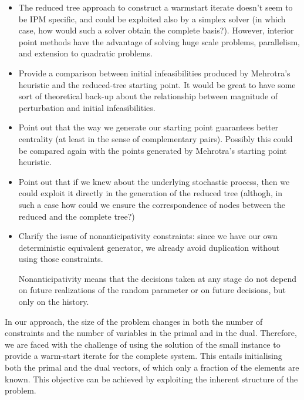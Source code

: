 \begin{itemize}
\item The reduced tree approach to construct a warmstart iterate 
doesn't seem to be IPM specific, and could be exploited also by a 
simplex solver (in which case, how would such a solver obtain the 
complete basis?). However, interior point methods have the advantage
of solving huge scale problems, parallelism, and extension to 
quadratic problems.

\item Provide a comparison between initial infeasibilities 
produced by Mehrotra's heuristic and the reduced-tree starting 
point. It would be great to have some sort of theoretical back-up 
about the relationship between magnitude of perturbation and 
initial infeasibilities.

\item Point out that the way we generate our starting point 
guarantees better centrality (at least in the sense of 
complementary pairs). Possibly this could be compared again 
with the points generated by Mehrotra's starting point heuristic.

\item Point out that if we knew about the underlying 
stochastic process, then we could exploit it directly in the 
generation of the reduced tree (althogh, in such a case how 
could we ensure the correspondence of nodes between the reduced 
and the complete tree?)

\item Clarify the issue of nonanticipativity constraints: 
since we have our own deterministic equivalent generator, we 
already avoid duplication without using those constraints.

Nonanticipativity means that the decisions taken at any stage 
do not depend on future realizations of the random parameter or 
on future decisions, but only on the history.
\end{itemize}

In our approach, the size of the problem changes in both 
the number of constraints and the number of variables in the 
primal and in the dual. Therefore, we are faced with the 
challenge of using the solution of the small instance to 
provide a warm-start iterate for the complete system. This 
entails initialising both the primal and the dual vectors, of 
which only a fraction of the elements are known. This objective 
can be achieved by exploiting the inherent structure of the problem.
